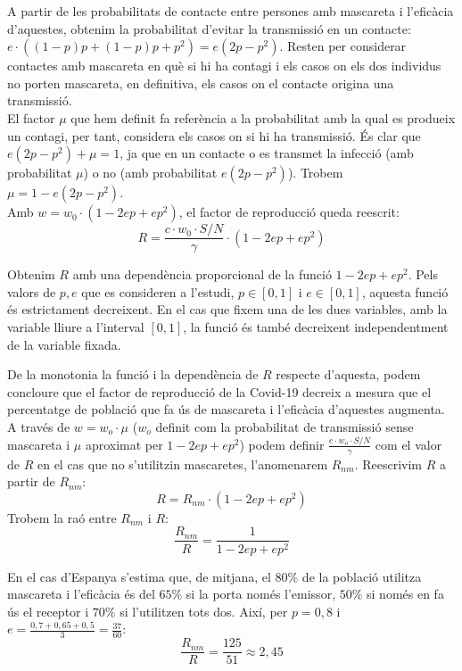 \documentclass[11pt,a4paper]{article}
\begin{document}
	A partir de les probabilitats de contacte entre persones amb mascareta i l'eficàcia d'aquestes, obtenim la probabilitat d'evitar la transmissió en un contacte: \(e\cdot((1-p)p+(1-p)p+p^2)=e(2p-p^2)\). Resten per considerar contactes amb mascareta en què si hi ha contagi i els casos on els dos individus no porten mascareta, en definitiva, els casos on el contacte origina una transmissió.\\
	
	El factor $\mu$ que hem definit fa referència a la probabilitat amb la qual es produeix un contagi, per tant, considera els casos on si hi ha transmissió. És clar que $e(2p-p^2)+\mu=1$, ja que en un contacte o es transmet la infecció (amb probabilitat $\mu$) o no (amb probabilitat $e(2p-p^2)$). Trobem $\mu=1-e(2p-p^2)$.\\ 
	\newline 
	Amb $w=w_0\cdot (1-2ep+ep^2)$, el factor de reproducció queda reescrit:
	\[R=\frac{c\cdot w_0\cdot S/N}{\gamma}\cdot (1-2ep+ep^2)\]
	
	Obtenim $R$ amb una dependència proporcional de la funció $1-2ep+ep^2$. Pels valors de $p,e$ que es consideren a l'estudi, $p\in[0,1]$ i $e\in[0,1]$, aquesta funció és estrictament decreixent. En el cas que fixem una de les dues variables, amb la variable lliure a l'interval $[0,1]$, la funció és també decreixent independentment de la variable fixada.
	
	De la monotonia la funció i la dependència de $R$ respecte d'aquesta, podem concloure que el factor de reproducció de la Covid-19 decreix a mesura que el percentatge de població que fa ús de mascareta i l'eficàcia d'aquestes augmenta.\\

	A través de $w=w_o\cdot \mu$ ($w_o$ definit com la probabilitat de transmissió sense mascareta i $\mu$ aproximat per $1-2ep+ep^2$) podem definir $\frac{c\cdot w_o\cdot S/N}{\gamma}$ com el valor de $R$ en el cas que no s'utilitzin mascaretes, l'anomenarem $R_{nm}$. Reescrivim $R$ a partir de $R_{nm}$:
	\[R= R_{nm}\cdot(1-2ep+ep^2)\] Trobem la raó entre $R_{nm}$ i $R$: \[\frac{R_{nm}}{R}=\frac{1}{1-2ep+ep^2}\]
	
	En el cas d'Espanya s'estima que, de mitjana, el $80\%$ de la població utilitza mascareta i l'eficàcia és del $65\%$ si la porta només l'emissor, $50\%$ si només en fa ús el receptor i $70\%$ si l'utilitzen tots dos.\cite{proteccio}\cite{perc} Així, per $p=0,8$ i $e=\frac{0,7+0,65+0,5}{3}=\frac{37}{60}$:
	\[\frac{R_{nm}}{R}=\frac{125}{51}\approx 2,45\]
	
\end{document}
